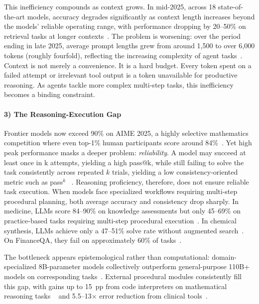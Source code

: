 \documentclass[sigconf,nonacm]{acmart}
\begin{document}
This inefficiency compounds as context grows. In mid-2025, across 18 state-of-the-art models, accuracy degrades significantly as context length increases beyond the models' reliable operating range, with performance dropping by 20--50\% on retrieval tasks at longer contexts~\cite{contextrot2025}. The problem is worsening: over the period ending in late 2025, average prompt lengths grew from around 1,500 to over 6,000 tokens (roughly fourfold), reflecting the increasing complexity of agent tasks~\cite{openrouter2026}.
Context is not merely a convenience. It is a hard budget. Every token spent on a failed attempt or irrelevant tool output is a token unavailable for productive reasoning. As agents tackle more complex multi-step tasks, this inefficiency becomes a binding constraint.




\paragraph{\textbf{3) The Reasoning-Execution Gap}}
\label{sec:gap}
Frontier models now exceed 90\% on AIME 2025, a highly selective mathematics competition where even top-1\% human participants score around 84\%~\cite{matharena2025}. Yet high peak performance masks a deeper problem: \textit{reliability}. 
A model may succeed at least once in  k attempts, yielding a high  pass@k, while still failing to solve the task  consistently across repeated  $k$ trials, yielding a low consistency-oriented metric such as pass$^k$ ~\cite{yao2024bench}. Reasoning proficiency, therefore, does not ensure reliable task execution. When models face specialized workflows requiring multi-step procedural planning, both average accuracy and consistency drop sharply.  In medicine, LLMs score 84--90\% on knowledge assessments but only 45--69\% on practice-based tasks requiring multi-step procedural execution~\cite{jmir2025medical}. In chemical synthesis, LLMs achieve only a 47--51\% solve rate without augmented search~\cite{synthelite2025}. On FinanceQA, they fail on approximately 60\% of tasks~\cite{financeqa2025}.


The bottleneck appears epistemological rather than computational: domain-specialized 8B-parameter models collectively outperform general-purpose 110B+ models on corresponding tasks~\cite{learnware2025}. External procedural modules consistently fill this gap, with gains up to 15~pp from code interpreters on mathematical reasoning tasks ~\cite{gao2023pal} and 5.5--13$\times$ error reduction from clinical tools~\cite{clinicalcalc2025}.
\end{document}
